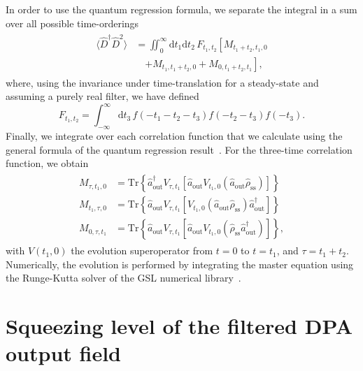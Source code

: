\documentclass[pra,twocolumn,superscriptaddress]{revtex4-1}
\newcommand{\aout}[0]{\hat{a}_{\mathrm{out}}}
\newcommand{\parS}[1]{\left[#1\right]}
\newcommand{\parO}[1]{\left(#1\right)}
\newcommand{\parC}[1]{\left\{#1\right\}}
\newcommand{\drm}[0]{\mathrm{d}}
\begin{document}
In order to use the quantum regression formula, we separate the integral in a sum over all possible time-orderings
\begin{align}
	\begin{split}
	\langle\hat D^\dag \hat D^2 \rangle 
	&= 
	\iint_{0}^{\infty} \drm t_1 \drm t_2  \, F_{t_1,t_2}
	\parS{
		M_{t_1+t_2,t_1,0}
		\right.\\ & \quad\left.
		+
		M_{t_1,t_1+t_2,0}
		+
		M_{0,t_1+t_2,t_1}
	},
	\end{split}
\end{align}
where, using the invariance under time-translation for a steady-state and assuming a purely real filter, we have defined
\begin{equation}
	F_{t_1,t_2} = \int_{-\infty}^{\infty} \drm t_3 \, f(-t_1-t_2-t_3) f(-t_2-t_3) f(-t_3).
\end{equation}
Finally, we integrate over each correlation function that we calculate using the general formula of the quantum regression result~\cite{Gardiner:2004fk}. For the three-time correlation function, we obtain
\begin{align}
	\begin{split}
	M_{\tau,t_1,0} &= 
	\mathrm{Tr}\parC{\aout^\dag V_{\tau,t_1}\parS{\aout V_{t_1,0} \parO{ \aout \hat \rho_{\mathrm{ss}}}}	} 
	\\
	M_{t_1,\tau,0} &= 
	\mathrm{Tr}\parC{\aout V_{\tau,t_1} [V_{t_1,0}\parO{ \aout \hat \rho_{\mathrm{ss}}}\aout^\dag ]} 
	\\
	M_{0,\tau,t_1} &= 
	\mathrm{Tr}\parC{\aout V_{\tau,t_1} [\aout V_{t_1,0}  (\hat \rho_{\mathrm{ss}}\aout^\dag) ] },
	\end{split}
\end{align}
with $V(t_1,0)$ the evolution superoperator from $t=0$ to $t=t_1$, and $\tau = t_1+t_2$. Numerically, the evolution is performed by integrating the master equation using the Runge-Kutta solver of the GSL numerical library~\cite{Galassi:2011uq}. 

\section{Squeezing level of the filtered DPA output field}
\label{app:filteredSq}
\end{document}

